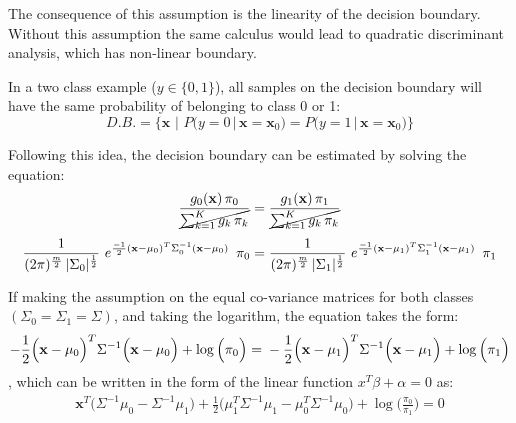 \noindent
The consequence of this assumption is the linearity of the decision boundary. Without this assumption the same calculus would lead to quadratic discriminant analysis, which has non-linear boundary.

In a two class example ($y \in \{0,1\}$), all samples on the decision boundary will have the same probability of belonging to class 0 or 1:
\begin{equation} 
D.B. = \Big\{\mathbf{x}\,\, \Big| \,\,P\big(y=0 \, \big| \, \mathbf{x}=\mathbf{x}_0\big) = P\big(y=1 \, \big| \, \mathbf{x}=\mathbf{x}_0\big) \Big\}
\end{equation}

Following this idea, the decision boundary can be estimated by solving the equation:
\begin{equation} 
\frac{g_0(\mathbf{x}) \, \pi_0} {\cancel{\sum_{k=1}^K{g_k \, \pi_k}}} = \frac{g_1(\mathbf{x}) \, \pi_1} {\cancel{\sum_{k=1}^K{g_k \, \pi_k}}}
\end{equation}
\begin{equation} 
\frac{1}{(2 \pi)^{\nicefrac{m}{2}}\, |\Sigma_0|^{\nicefrac{1}{2}}}\,\, e^{\nicefrac{-1}{2}  (\mathbf{x}-\mu_0)^T  \Sigma_0^{-1} (\mathbf{x}-\mu_0)}  \,\,\,\pi_0 = \\
\frac{1}{(2 \pi)^{\nicefrac{m}{2}}\, |\Sigma_1|^{\nicefrac{1}{2}}}\,\, e^{\nicefrac{-1}{2}  (\mathbf{x}-\mu_1)^T  \Sigma_1^{-1} (\mathbf{x}-\mu_1)}  \,\,\,\pi_1
\end{equation}

If making the assumption on the equal co-variance matrices for both classes $(\Sigma_0 = \Sigma_1  = \Sigma)$, and taking the logarithm, the equation takes the form: 
\begin{equation} 
-\frac{1}{2}  \Big(\mathbf{x}-\mu_0\Big)^T  \Sigma^{-1} \Big(\mathbf{x}-\mu_0\Big) +  \log{\Big(\pi_0\Big)}= \\
-\frac{1}{2}  \Big(\mathbf{x}-\mu_1\Big)^T  \Sigma^{-1} \Big(\mathbf{x}-\mu_1\Big) +  \log{\Big(\pi_1\Big)}
\end{equation}
, which can be written in the form of the linear function $x^T\beta + \alpha = 0$ as:
\begin{equation} 
\begin{split}
\mathbf{x}^T\Big(\Sigma^{-1} \mu_0 - \Sigma^{-1} \mu_1\Big) + \frac{1}{2} \Big(\mu_1^T \Sigma^{-1}\mu_1 - \mu_0^T \Sigma^{-1}\mu_0\Big)
+ \log\Big( \frac{\pi_0}{\pi_1}  \Big) = 0
\end{split}
\end{equation}

